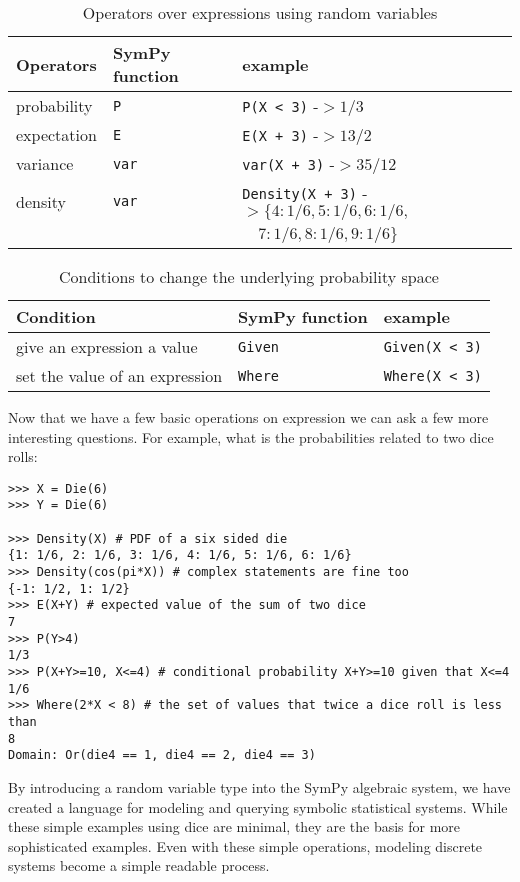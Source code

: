 \begin{table}[h]
\begin{tabular}{|lll|}
\hline
Operators & SymPy function & example\\ \hline
probability & {\tt P} & {\tt P(X < 3)}  -$> 1/3$\\ \hline
expectation & {\tt E} & {\tt E(X + 3)}  -$> 13/2$ \\ \hline
variance & {\tt var} & {\tt var(X + 3)} -$> 35/12$\\ \hline
density & {\tt var} & {\tt Density(X + 3)}  -$> \{4: 1/6, 5: 1/6, 6: 1/6,$ \\
            & & \phantom{Density(X+3)  -$> \{$ } $\quad 7: 1/6,  8: 1/6, 9: 1/6\}$ \\ \hline
\end{tabular}
\label{tab:stat_ops}
\caption{Operators over expressions using random variables}
\end{table}

\begin{table}[h]
\begin{tabular}{|lll|}
\hline
Condition & SymPy function & example\\ \hline
give an expression a value & {\tt Given} & {\tt Given(X < 3)} \\ \hline
set the value of an expression & {\tt Where} & {\tt Where(X < 3)} \\ \hline
\end{tabular}
\label{tab:cond_ops}
\caption{Conditions to change the underlying probability space}
\end{table}

Now that we have a few basic operations on expression we can ask a few more
interesting questions. For example, what is the probabilities related to two
dice rolls:
\begin{lstlisting}
>>> X = Die(6)
>>> Y = Die(6)

>>> Density(X) # PDF of a six sided die
{1: 1/6, 2: 1/6, 3: 1/6, 4: 1/6, 5: 1/6, 6: 1/6}
>>> Density(cos(pi*X)) # complex statements are fine too
{-1: 1/2, 1: 1/2}
>>> E(X+Y) # expected value of the sum of two dice
7
>>> P(Y>4)
1/3
>>> P(X+Y>=10, X<=4) # conditional probability X+Y>=10 given that X<=4
1/6
>>> Where(2*X < 8) # the set of values that twice a dice roll is less than
8
Domain: Or(die4 == 1, die4 == 2, die4 == 3)
\end{lstlisting}

By introducing a random variable type into the SymPy algebraic system, we have
created a language for modeling and querying symbolic statistical systems.
While these simple examples using dice are minimal, they are the basis for more
sophisticated examples.  Even with these simple operations, modeling discrete
systems become a simple readable process.
